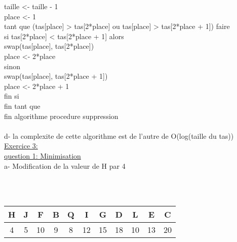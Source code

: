 \documentclass [11pt]{report}
\begin{document}
\indent taille <- taille - 1\\
\indent place <- 1\\
\indent tant que (tas[place] > tas[2*place] ou tas[place] > tas[2*place + 1]) faire \\
\indent \indent si tas[2*place] < tas[2*place + 1] alors\\
\indent \indent \indent	swap(tas[place], tas[2*place])\\
\indent \indent \indent	place <- 2*place\\
\indent \indent	sinon\\
\indent \indent \indent	swap(tas[place], tas[2*place + 1])\\
\indent \indent \indent	place <- 2*place + 1\\
\indent \indent	fin si\\
\indent fin tant que\\
fin algorithme procedure suppression\\
\vspace{5mm}\\
 d- la complexite de cette algorithme est de l'autre de O(log(taille du tas))
 \vspace{10mm}\\
 \underline{{\huge Exercice 3:}}\\
\underline{question 1: Minimisation}\\
\indent a- Modification de la valeur de H par 4\\
\\
\vspace{2mm}\\
\begin{tabular}{|c|c|c|c|c|c|c|c|c|c|c|}
\hline H & J & F  & B & Q & I  & G  &  D & L  & E  & C \\ 
\hline 4 & 5 & 10 & 9 & 8 & 12 & 15 & 18 & 10 & 13 & 20 \\ 
\hline 
\end{tabular} \\
\end{document}
